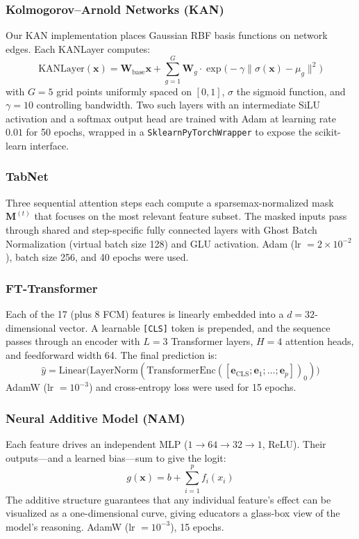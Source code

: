 \documentclass[journal, onecolumn]{IEEEtran}
\begin{document}
\subsubsection{Kolmogorov--Arnold Networks (KAN)}
Our KAN implementation places Gaussian RBF basis functions on network edges. Each KANLayer computes:
\begin{equation}
    \text{KANLayer}(\mathbf{x}) = \mathbf{W}_{\text{base}} \mathbf{x} + \sum_{g=1}^{G} \mathbf{W}_{g} \cdot \exp\!\bigl(-\gamma \| \sigma(\mathbf{x}) - \mu_g \|^2\bigr)
\end{equation}
with $G=5$ grid points uniformly spaced on $[0,1]$, $\sigma$ the sigmoid function, and $\gamma=10$ controlling bandwidth. Two such layers with an intermediate SiLU activation and a softmax output head are trained with Adam at learning rate $0.01$ for 50 epochs, wrapped in a \texttt{SklearnPyTorchWrapper} to expose the scikit-learn interface.

\subsubsection{TabNet}
Three sequential attention steps each compute a sparsemax-normalized mask $\mathbf{M}^{(t)}$ that focuses on the most relevant feature subset. The masked inputs pass through shared and step-specific fully connected layers with Ghost Batch Normalization (virtual batch size 128) and GLU activation. Adam (lr $= 2\times10^{-2}$), batch size 256, and 40 epochs were used.

\subsubsection{FT-Transformer}
Each of the 17 (plus 8 FCM) features is linearly embedded into a $d=32$-dimensional vector. A learnable \texttt{[CLS]} token is prepended, and the sequence passes through an encoder with $L=3$ Transformer layers, $H=4$ attention heads, and feedforward width 64. The final prediction is:
\begin{equation}
    \hat{y} = \text{Linear}\!\bigl(\text{LayerNorm}(\text{TransformerEnc}([\mathbf{e}_{\text{CLS}}; \mathbf{e}_1; \ldots; \mathbf{e}_p])_0)\bigr)
\end{equation}
AdamW (lr $=10^{-3}$) and cross-entropy loss were used for 15 epochs.

\subsubsection{Neural Additive Model (NAM)}
Each feature drives an independent MLP ($1 \to 64 \to 32 \to 1$, ReLU). Their outputs---and a learned bias---sum to give the logit:
\begin{equation}
    g(\mathbf{x}) = b + \sum_{i=1}^{p} f_i(x_i)
\end{equation}
The additive structure guarantees that any individual feature's effect can be visualized as a one-dimensional curve, giving educators a glass-box view of the model's reasoning. AdamW (lr $=10^{-3}$), 15 epochs.
\end{document}
